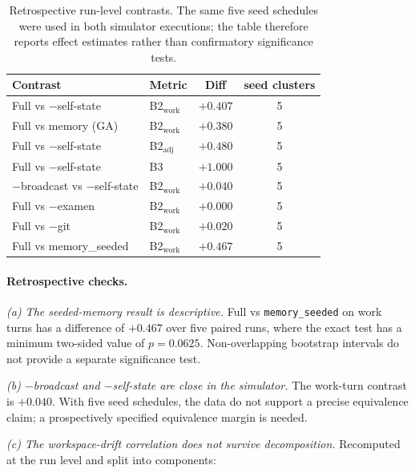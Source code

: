 \documentclass[11pt]{article}
\begin{document}
\begin{table}[h]
\centering\small
\begin{tabular}{llcc}
\toprule
\textbf{Contrast} & \textbf{Metric} & \textbf{Diff} & \textbf{seed clusters} \\
\midrule
Full vs $-$self-state & B2$_{\mathrm{work}}$ & $+0.407$ & 5 \\
Full vs memory (GA) & B2$_{\mathrm{work}}$ & $+0.380$ & 5 \\
Full vs $-$self-state & B2$_{\mathrm{adj}}$ & $+0.480$ & 5 \\
Full vs $-$self-state & B3 & $+1.000$ & 5 \\
$-$broadcast vs $-$self-state & B2$_{\mathrm{work}}$ & $+0.040$ & 5 \\
Full vs $-$examen & B2$_{\mathrm{work}}$ & $+0.000$ & 5 \\
Full vs $-$git & B2$_{\mathrm{work}}$ & $+0.020$ & 5 \\
Full vs memory\_seeded & B2$_{\mathrm{work}}$ & $+0.467$ & 5 \\
\bottomrule
\end{tabular}
\caption{Retrospective run-level contrasts. The same five seed schedules were used in both simulator executions; the table therefore reports effect estimates rather than confirmatory significance tests.}
\label{tab:stats}
\end{table}

\paragraph{Retrospective checks.}

\emph{(a) The seeded-memory result is descriptive.} Full vs \texttt{memory\_seeded} on work turns has a difference of $+0.467$ over five paired runs, where the exact test has a minimum two-sided value of $p=0.0625$. Non-overlapping bootstrap intervals do not provide a separate significance test.

\emph{(b) $-$broadcast and $-$self-state are close in the simulator.} The work-turn contrast is $+0.040$. With five seed schedules, the data do not support a precise equivalence claim; a prospectively specified equivalence margin is needed.

\emph{(c) The workspace-drift correlation does not survive decomposition.} Recomputed at the run level and split into components:
\end{document}
